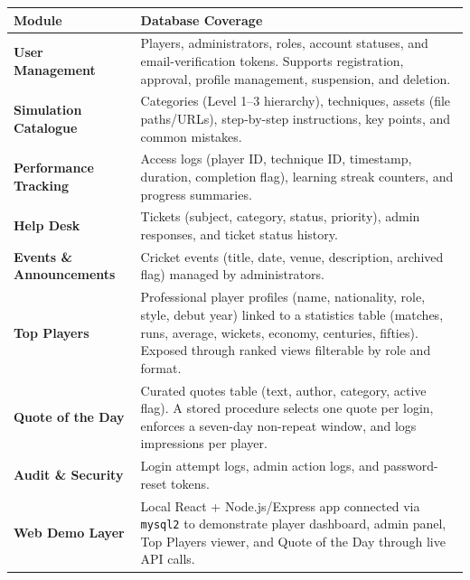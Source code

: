 \documentclass[12pt,a4paper]{article}
\begin{document}
\begin{longtable}{>{\bfseries}p{4cm} p{9.5cm}}
    \toprule
    Module & Database Coverage \\
    \midrule
    \endhead

    User Management &
    Players, administrators, roles, account statuses, and
    email-verification tokens. Supports registration, approval,
    profile management, suspension, and deletion. \\[4pt]

    Simulation Catalogue &
    Categories (Level 1--3 hierarchy), techniques, assets (file paths/URLs),
    step-by-step instructions, key points, and common mistakes. \\[4pt]

    Performance Tracking &
    Access logs (player ID, technique ID, timestamp, duration, completion
    flag), learning streak counters, and progress summaries. \\[4pt]

    Help Desk &
    Tickets (subject, category, status, priority), admin responses,
    and ticket status history. \\[4pt]

    Events \& Announcements &
    Cricket events (title, date, venue, description, archived flag)
    managed by administrators. \\[4pt]

    Top Players &
    Professional player profiles (name, nationality, role, style, debut year)
    linked to a statistics table (matches, runs, average, wickets, economy,
    centuries, fifties). Exposed through ranked views filterable by role
    and format. \\[4pt]

    Quote of the Day &
    Curated quotes table (text, author, category, active flag). A stored
    procedure selects one quote per login, enforces a seven-day non-repeat
    window, and logs impressions per player. \\[4pt]

    Audit \& Security &
    Login attempt logs, admin action logs, and password-reset tokens. \\[4pt]

    Web Demo Layer &
    Local React + Node.js/Express app connected via \texttt{mysql2} to
    demonstrate player dashboard, admin panel, Top Players viewer, and
    Quote of the Day through live API calls. \\

    \bottomrule
\end{longtable}
\end{document}
